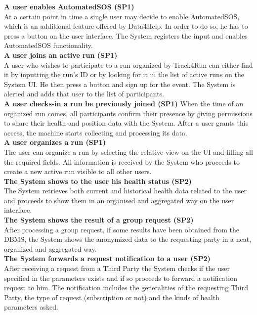 \documentclass[titlepage]{article}
\begin{document}
{\bf A user enables AutomatedSOS (SP1)} \\
At a certain point in time a single user may decide to enable AutomatedSOS, which is an additional feature offered by Data4Help. In order to do so, he has to press a button on the user interface. The System registers the input and enables AutomatedSOS functionality.\\

{\bf A user joins an active run (SP1)} \\
A user who wishes  to participate to a run organized by Track4Run can either find it by inputting the run’s ID or by looking for it in the list of active runs on the System UI. He then press a button and sign up for the event. The System is alerted and adds that user to the list of participants. \\

{\bf A user checks-in a run he previously joined (SP1)}
When the time of an organized run comes, all participants confirm their presence by giving permissions to share their health and position data with the System. After a user grants this access, the machine starts collecting and processing its data.\\

{\bf A user organizes a run (SP1)}\\
The user can organize a run by selecting the relative view on the UI and filling all the required fields. All information is received by the System who proceeds to create a new active run visible to all other users.\\

{\bf The System shows to the user his health status (SP2)} \\
The System retrieves both current and historical health data related to the user and proceeds to show them in an organised and aggregated way on the user interface.\\

{\bf The System shows the result of a group request (SP2)} \\
After processing a group request, if some results have been obtained from the DBMS, the System shows the anonymized data to the requesting party in a neat, organized and aggregated way.\\

{\bf The System forwards a request notification to a user (SP2)} \\
After receiving a request from a Third Party the System checks if the user specified in the parameters exists and if so proceeds to forward a notification request to him. The notification includes the generalities of the requesting Third Party, the type of request (subscription or not) and the kinds of health parameters asked.\\
\end{document}
